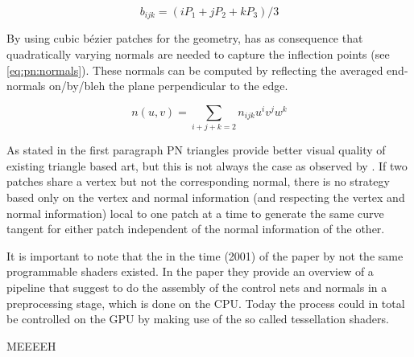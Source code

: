 \begin{equation}\label{eq:pn:spread}
	b_{ijk} = (iP_1 + jP_2 + kP_3) / 3
\end{equation}

By using cubic b\'ezier patches for the geometry, has as consequence that quadratically varying normals are needed to capture the inflection points (see \eqref{eq:pn:normals}). These normals can be computed by reflecting the averaged end-normals on/by/bleh the plane perpendicular to the edge.


\begin{equation}\label{eq:pn:normals}
	n(u,v) = \sum\limits_{i+j+k=2} n_{ijk} u^i v^j w^k
\end{equation}


As stated in the first paragraph PN triangles provide better visual quality of existing triangle based art, but this is not always the case as observed by \citeauthor{vlachos2001curved}. If two patches share a vertex but not the corresponding normal, there is no strategy based only on the vertex and normal information (and respecting the vertex and normal information) local to one patch at a time to generate the same curve tangent for either patch independent of the normal information of the other. 

It is important to note that the in the time (2001) of the paper by \citeauthor{vlachos2001curved} not the same programmable shaders existed. In the paper they provide an overview of a pipeline that suggest to do the assembly of the control nets and normals in a preprocessing stage, which is done on the CPU. Today the process could in total be controlled on the GPU by making use of the so called tessellation shaders.

MEEEEH